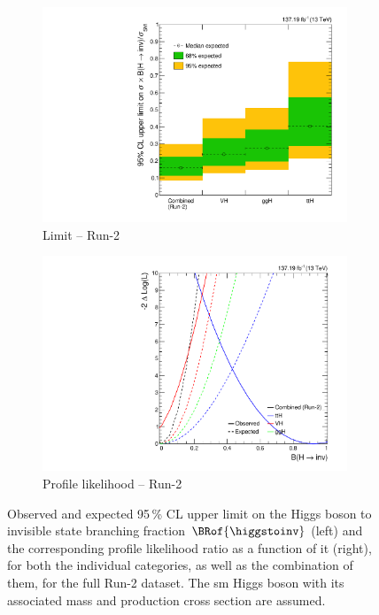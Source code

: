 \begin{figure}[htbp]
    \centering
    \begin{subfigure}[b]{0.45\textwidth}  %
        \includegraphics[width=\textwidth]{figures/limits/full_Run2/limit_Run2_comb_per_cat.pdf}
        \caption{Limit -- Run-2}
    \end{subfigure}
    \hspace{0.05\textwidth}
    \begin{subfigure}[b]{0.45\textwidth}
        \includegraphics[width=\textwidth]{figures/likelihood_scan/profile_likelihood_scan_Run2_per_cat.pdf}
        \caption{Profile likelihood -- Run-2}
    \end{subfigure}
    \caption[Observed and expected 95\,\% CL upper limit on the Higgs boson to invisible state branching fraction $\BRof{\higgstoinv}$ and the corresponding profile likelihood ratio as a function of it, for both the individual categories, as well as the combination of them, for the full Run-2 dataset]{Observed and expected 95\,\% CL upper limit on the Higgs boson to invisible state branching fraction $\BRof{\higgstoinv}$ (left) and the corresponding profile likelihood ratio as a function of it (right), for both the individual categories, as well as the combination of them, for the full Run-2 dataset. The \acrlong{sm} Higgs boson with its associated mass and production cross section are assumed.}
    \label{fig:htoinv_limit_likelihood_Run2_per_cat}
\end{figure}

